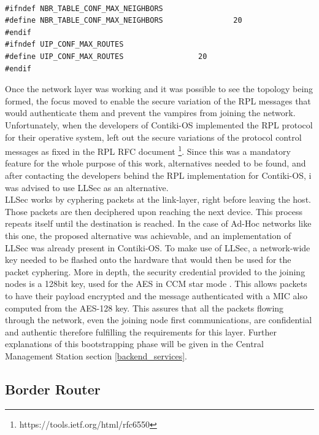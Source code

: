\begin{lstlisting}[caption={RPL Configurations}]

#ifndef NBR_TABLE_CONF_MAX_NEIGHBORS
#define NBR_TABLE_CONF_MAX_NEIGHBORS                20
#endif
#ifndef UIP_CONF_MAX_ROUTES
#define UIP_CONF_MAX_ROUTES                 20
#endif

\end{lstlisting}

Once the network layer was working and it was possible to see the topology being formed, the focus moved to enable the secure variation of the \gls{RPL} messages that would authenticate them and prevent the vampires from joining the network. Unfortunately, when the developers of Contiki-OS implemented the \gls{RPL} protocol for their operative system, left out the secure variations of the protocol control messages as fixed in the \gls{RPL} RFC document \footnote{https://tools.ietf.org/html/rfc6550}. Since this was a mandatory feature for the whole purpose of this work, alternatives needed to be found, and after contacting the developers behind the \gls{RPL} implementation for Contiki-OS, i was advised to use \gls{LLSec} as an alternative.\\
\gls{LLSec} works by cyphering packets at the link-layer, right before leaving the host. Those packets are then deciphered upon reaching the next device. This process repeats itself until the destination is reached. In the case of Ad-Hoc networks like this one, the proposed alternative was achievable, and an implementation of \gls{LLSec} was already present in Contiki-OS. To make use of \gls{LLSec}, a network-wide key needed to be flashed onto the hardware that would then be used for the packet cyphering. More in depth, the security credential provided to the joining nodes is a 128bit key, used for the \gls{AES} \cite{Fips2001} in \gls{CCM} star mode \cite{Corp2005}. This allows packets to have their payload encrypted and the message authenticated with a \gls{MIC} also computed from the AES-128 key. This assures that all the packets flowing through the network, even the joining node first communications, are confidential and authentic therefore fulfilling the requirements for this layer. Further explanations of this bootstrapping phase will be given in the Central Management Station section \ref{backend_services}.

\subsection{Border Router}

